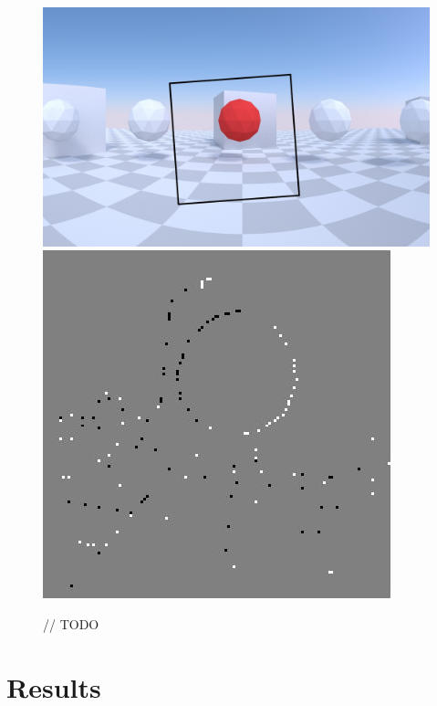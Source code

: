 \documentclass[10pt,twocolumn,letterpaper]{article}
\begin{document}
\begin{figure}
\label{fig:simulation}
\includegraphics[width=\linewidth]{images/simulation_raw.jpg}
\includegraphics[width=\linewidth]{images/simulation_events.jpg}
\caption{// TODO}
\end{figure}
\section{Results}




{\small


}
\end{document}

